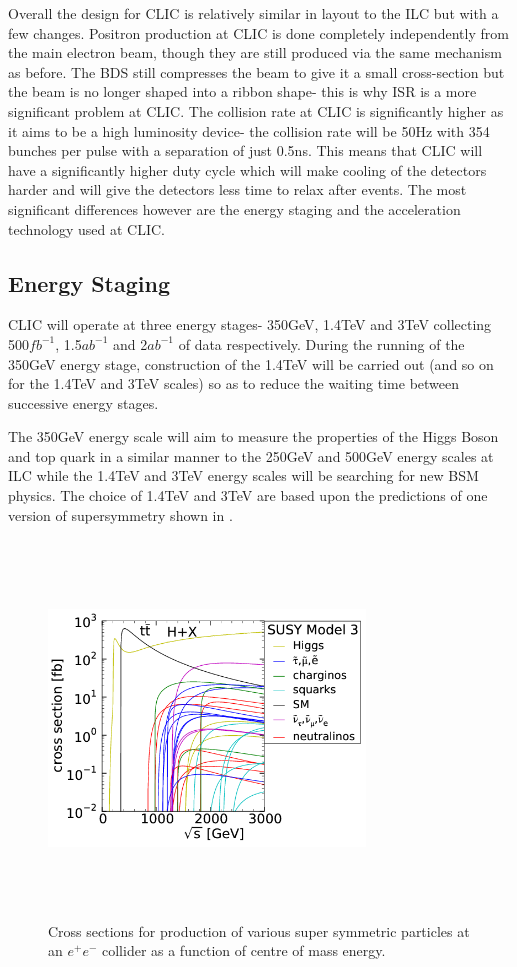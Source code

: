 Overall the design for \ac{CLIC} is relatively similar in layout to the \ac{ILC} but with a few changes. Positron production at \ac{CLIC} is done completely independently from the main electron beam, though they are still produced via the same mechanism as before. The \ac{BDS} still compresses the beam to give it a small cross-section but the beam is no longer shaped into a ribbon shape- this is why \ac{ISR} is a more significant problem at \ac{CLIC}. The collision rate at \ac{CLIC} is significantly higher as it aims to be a high luminosity device- the collision rate will be 50Hz with 354 bunches per pulse with a separation of just 0.5ns. This means that CLIC will have a significantly higher duty cycle which will make cooling of the detectors harder and will give the detectors less time to relax after events. The most significant differences however are the energy staging and the acceleration technology used at \ac{CLIC}.
\subsection{Energy Staging}
CLIC will operate at three energy stages- 350GeV, 1.4TeV and 3TeV collecting 500${fb^{-1}}$, 1.5${ab^{-1}}$ and 2${ab^{-1}}$ of data respectively. During the running of the 350GeV energy stage, construction of the 1.4TeV will be carried out (and so on for the 1.4TeV and 3TeV scales) so as to reduce the waiting time between successive energy stages.

The 350GeV energy scale will aim to measure the properties of the Higgs Boson and top quark in a similar manner to the 250GeV and 500GeV energy scales at \ac{ILC} while the 1.4TeV and 3TeV energy scales will be searching for new \ac{BSM} physics. The choice of 1.4TeV and 3TeV are based upon the predictions of one version of supersymmetry shown in .
\begin{figure}
  \centering
  \includegraphics[width=0.75\textwidth,height=10cm,keepaspectratio]{fig/clicSS}
  \caption[Cross Sections For Super Symmetric Processes]{Cross sections for production of various super symmetric particles at an ${e^+e^-}$ collider as a function of centre of mass energy.}
  \label{Fig:SuperSym}
\end{figure}

